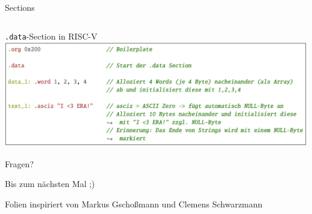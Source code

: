 \documentclass[
  german,            %
  aspectratio=169,    %
]{tumbeamer}
\begin{document}
\begin{frame}[c]{Sections}{}
\begin{columns}[c]
\begin{column}{.3\textwidth}
		\end{column}
	\end{columns}
\end{frame}


\begin{frame}[fragile]{\texttt{.data}-Section in RISC-V}{}
  \includegraphics[width=1.0\linewidth]{data-section.png}
\end{frame}

\begin{frame}[c]{}{}
  \begin{center}
    \LARGE Fragen?
  \end{center}
  \vspace{0.5cm}
  \begin{center}
    \LARGE Bis zum nächsten Mal ;) \\
  \end{center}
  \vspace{1.0cm}
  \begin{center}
    \small Folien inspiriert von Markus Gschoßmann und Clemens Schwarzmann
  \end{center}
\end{frame}
\end{document}
